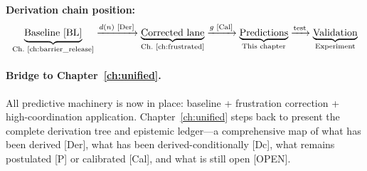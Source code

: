 \bigskip
\noindent
\textbf{Derivation chain position:}
\begin{equation*}
    \underbrace{\text{Baseline [BL]}}_{\text{Ch.~\ref{ch:barrier_release}}}
    \xrightarrow{d(n) \text{ [Der]}}
    \underbrace{\text{Corrected lane}}_{\text{Ch.~\ref{ch:frustrated}}}
    \xrightarrow{g \text{ [Cal]}}
    \underbrace{\text{Predictions}}_{\text{This chapter}}
    \xrightarrow{\text{test}}
    \underbrace{\text{Validation}}_{\text{Experiment}}
\end{equation*}

\paragraph{Bridge to Chapter~\ref{ch:unified}.}
All predictive machinery is now in place: baseline + frustration correction +
high-coordination application. Chapter~\ref{ch:unified} steps back to present
the complete derivation tree and epistemic ledger---a comprehensive map of
what has been derived [Der], what has been derived-conditionally [Dc], what
remains postulated [P] or calibrated [Cal], and what is still open [OPEN].

